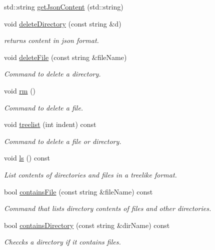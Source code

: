 \begin{DoxyCompactItemize}
std\+::string \hyperlink{class_directory_ad4b9f8d48a33526ac1c61dbce3753f1d}{get\+Json\+Content} (std\+::string)
\item 
void \hyperlink{class_directory_a8d233286b4964b8261543fa823e66f9e}{delete\+Directory} (const string \&d)
\begin{DoxyCompactList}\small\item\em returns content in json format. \end{DoxyCompactList}\item 
void \hyperlink{class_directory_ac5d2847c135eff94ce4fedd8099de18a}{delete\+File} (const string \&file\+Name)
\begin{DoxyCompactList}\small\item\em Command to delete a directory. \end{DoxyCompactList}\item 
void \hyperlink{class_directory_ad764e9b4d0568c0acf788a15e0621f1a}{rm} ()
\begin{DoxyCompactList}\small\item\em Command to delete a file. \end{DoxyCompactList}\item 
void \hyperlink{class_directory_af21c038562a88b24df0cb6e0c361febd}{treelist} (int indent) const
\begin{DoxyCompactList}\small\item\em Command to delete a file or directory. \end{DoxyCompactList}\item 
void \hyperlink{class_directory_a97bf31f9a554ff687a410f735d8770dd}{ls} () const
\begin{DoxyCompactList}\small\item\em List contents of directories and files in a treelike format. \end{DoxyCompactList}\item 
bool \hyperlink{class_directory_a0286ef72f0d7cd5a0be7c15c0db46942}{contains\+File} (const string \&file\+Name) const
\begin{DoxyCompactList}\small\item\em Command that lists directory contents of files and other directories. \end{DoxyCompactList}\item 
bool \hyperlink{class_directory_ae84d7cdbbea5138b808dca098c28c820}{contains\+Directory} (const string \&dir\+Name) const
\begin{DoxyCompactList}\small\item\em Checcks a directory if it contains files. \end{DoxyCompactList}\item 

\end{DoxyCompactItemize}
